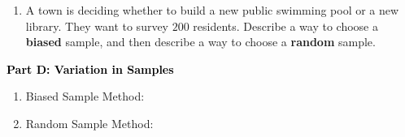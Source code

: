 \documentclass[12pt, letterpaper, fleqn]{article}
\newcommand{\blank}{\underline{\hspace{2.2cm}}}
\newcommand{\blanklong}{\underline{\hspace{6.5cm}}}
\begin{document}
\begin{enumerate}[itemsep=4.2cm, leftmargin=0.6cm, resume]
\begin{itemize}
\item Based on these three samples, what is a reasonable estimate for the actual number of red jellybeans in the jar? \blank
\end{itemize}
\item A town is deciding whether to build a new public swimming pool or a new library. They want to survey $200$ residents. Describe a way to choose a \textbf{biased} sample, and then describe a way to choose a \textbf{random} sample.
\end{enumerate}

\newpage

\begin{tcolorbox}[colback=customteal!20]
\large\textcolor{black}{\textbf{Part D: Variation in Samples}}
\end{tcolorbox}

\vspace{3mm}

\begin{enumerate}[itemsep=4.2cm, leftmargin=0.6cm, resume]
\item Biased Sample Method: \blanklong
\item Random Sample Method: \blanklong
\end{enumerate}
\end{document}
